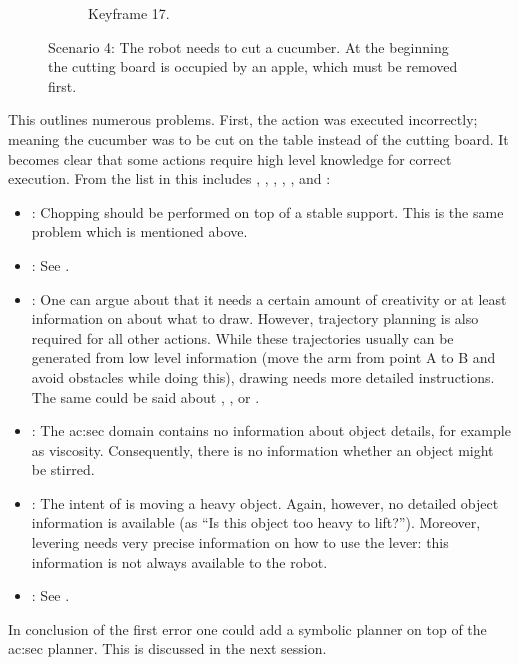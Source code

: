 \begin{figure}
\begin{subfigure}[t]{0.475\textwidth}
    \caption{Keyframe 17.}
    \label{fig:sec_usingaffordanceforplanning_results_scenario4_17}
  \end{subfigure}
  \caption{Scenario 4: The robot needs to cut a cucumber. At the beginning the cutting board is occupied by an apple, which must be removed first.}
  \label{fig:sec_usingaffordanceforplanning_results_scenario4}
\end{figure}

This outlines numerous problems.
First, the action  was executed incorrectly; meaning the cucumber was to be cut on the table instead of the cutting board.
It becomes clear that some actions require high level knowledge for correct execution.
From the list in  this includes , , , , , and :

\begin{itemize}
  \item {}: Chopping should be performed on top of a stable support. This is the same problem which is mentioned above.
  \item {}: See .
  \item {}: One can argue about  that it needs a certain amount of creativity or at least information on about what to draw. However, trajectory planning is also required for all other actions. While these trajectories usually can be generated from low level information (\eg move the arm from point A to B and avoid obstacles while doing this), drawing needs more detailed instructions. The same could be said about , , or .
  \item {}: The \gls{ac:sec} domain contains no information about object details, for example as viscosity. Consequently, there is no information whether an object might be stirred.
  \item {}: The intent of  is moving a heavy object. Again, however, no detailed object information is available (as ``Is this object too heavy to lift?''). Moreover, levering needs very precise information on how to use the lever: this information is not always available to the robot.
  \item {}: See .
\end{itemize}

In conclusion of the first error one could add a symbolic planner on top of the \gls{ac:sec} planner.
This is discussed in the next session.

